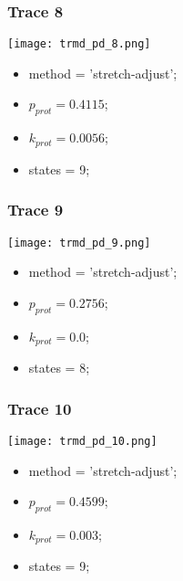 \subsubsection{Trace 8}
\begin{minipage}[c]{0.7\textwidth}
	\texttt{[image: trmd\_pd\_8.png]}
\end{minipage}
\hfill
\begin{minipage}[c]{0.45\textwidth}
	\begin{itemize}
		\item method = 'stretch-adjust';
		\item $p_{prot}=0.4115$;
		\item $k_{prot}=0.0056$;
		\item states = 9;
	\end{itemize}
\end{minipage}

\subsubsection{Trace 9}
\begin{minipage}[c]{0.7\textwidth}
	\texttt{[image: trmd\_pd\_9.png]}
\end{minipage}
\hfill
\begin{minipage}[c]{0.45\textwidth}
	\begin{itemize}
		\item method = 'stretch-adjust';
		\item $p_{prot}=0.2756$;
		\item $k_{prot}=0.0$;
		\item states = 8;
	\end{itemize}
\end{minipage}

\subsubsection{Trace 10}
\begin{minipage}[c]{0.7\textwidth}
	\texttt{[image: trmd\_pd\_10.png]}
\end{minipage}
\hfill
\begin{minipage}[c]{0.45\textwidth}
	\begin{itemize}
			\item method = 'stretch-adjust';
			\item $p_{prot}=0.4599$;
			\item $k_{prot}=0.003$;
			\item states = 9;
	\end{itemize}
\end{minipage}


